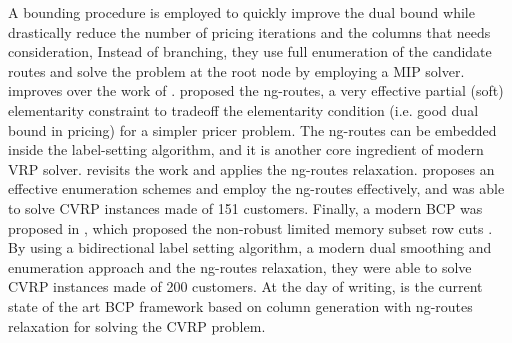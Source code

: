A bounding procedure is employed to quickly
improve the dual bound while drastically reduce the number
of pricing iterations and the columns that needs consideration,
Instead of branching, they use full enumeration of the candidate
routes and solve the problem at the root node by employing a MIP solver.
\textcite{pessoa2008} improves over the work of \citeauthor{fukasawa2006}.
\textcite{baldacci2011} proposed the ng-routes, a very effective
partial (soft) elementarity constraint
to tradeoff the elementarity condition (i.e. good dual bound in pricing)
for a simpler pricer problem.
The ng-routes can be embedded inside the label-setting algorithm, and
it is another core ingredient of modern VRP solver.
\textcite{ropke2012} revisits the work \citeauthor{fukasawa2006} and applies
the ng-routes relaxation.
\textcite{contardo2014} proposes an effective enumeration schemes and employ the ng-routes effectively,
and was able to solve CVRP instances made of 151 customers.
Finally, a modern BCP was proposed in \textcite{pecin2017}, which
proposed the non-robust limited memory subset row cuts \parencite{pecin2017a}.
By using a bidirectional label setting algorithm, a modern dual smoothing and enumeration
approach and the ng-routes relaxation, they were able to solve CVRP
instances made of 200 customers.
At the day of writing, \textcite{pessoa2020a} is the current state of the
art BCP framework based on column generation with ng-routes relaxation
for solving the CVRP problem.






\begin{comment}
\cite{jepsen_branch-and-cut_2011}

Before 1980 very few exact algorithms for cvrp and vrptw had been
proposed, but in the early 1980s two new exact methods where proposed.
From this point the history of exact methods for cvrp and vrptw can
be divided into three phases. The first phase was the introduction of the
Set Partition and the development of Branch-and-Cut-and-Price (bp) algo-
rithms using a relaxed pricing problem. The second was the development of
Branch-and-Cut (bac) algorithms. In the current phase the pricing problem
is no longer relaxed and cuts in the master problem of the Branch-and-Cut-
and-Price algorithms is used. The first two phases where started at the same
point in time and there is still development on the algorithms in the context
of cvrp and vrptw. The algorithms from these two phases are also used
on several other variants of the Vehicle Routing Problem. The third phase
was started in the middle of the 2000s and the algorithms from this phase
are currently the best overall performing algorithms.
\end{comment}

